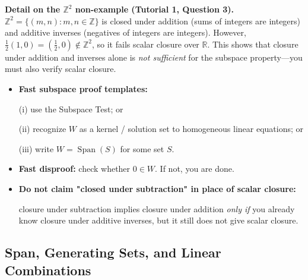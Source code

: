 \begin{policynote}
\textbf{Detail on the $\mathbb{Z}^2$ non-example (Tutorial 1, Question 3).}
$\mathbb{Z}^2=\{(m,n):m,n\in\mathbb{Z}\}$ is closed under addition (sums of integers are integers) and additive inverses (negatives of integers are integers).
However, $\frac{1}{2}(1,0)=(\frac{1}{2},0)\notin\mathbb{Z}^2$, so it fails scalar closure over $\mathbb{R}$.
This shows that closure under addition and inverses alone is \emph{not sufficient} for the subspace property---you must also verify scalar closure.
\end{policynote}

\begin{examtip}

\begin{itemize}[leftmargin=*]

\item \textbf{Fast subspace proof templates:}

(i) use the Subspace Test; or

(ii) recognize $W$ as a kernel / solution set to homogeneous linear equations; or

(iii) write $W=\operatorname{Span}(S)$ for some set $S$.

\item \textbf{Fast disproof:} check whether $0\in W$. If not, you are done.

\item \textbf{Do not claim "closed under subtraction" in place of scalar closure:}

closure under subtraction implies closure under addition \emph{only if} you already know closure under additive inverses, but it still does not give scalar closure.

\end{itemize}

\end{examtip}


\subsection{Span, Generating Sets, and Linear Combinations}



